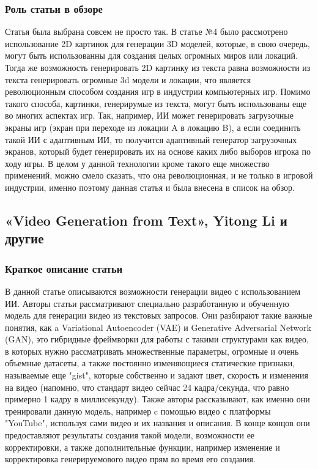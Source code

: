 \documentclass[14pt]{article}
\begin{document}
\subsubsection{Роль статьи в обзоре}
Статья была выбрана совсем не просто так. В статье №4 было рассмотрено использование 2D картинок для генерации 3D моделей, которые, в свою очередь, могут быть использованны для создания целых огромных миров или локаций. Тогда же возможность генерировать 2D картинку из текста равна возможности из текста генерировать огромные 3d модели и локации, что является революционным способом создания игр в индустрии компьютерных игр. Помимо такого способа, картинки, генерирумые из текста, могут быть использованы еще во многих аспектах игр. Так, например, ИИ может генерировать загрузочные экраны игр (экран при переходе из локации A в локацию B), а если соединить такой ИИ с адаптивным ИИ, то получится адаптивный генератор загрузочных экранов, который будет генерировать их на основе каких либо выборов игрока по ходу игры. В целом у данной технологии кроме такого еще множество применений, можно смело сказать, что она революционная, и не только в игровой индустрии, именно поэтому данная статья и была внесена в список на обзор.

\subsection{«Video Generation from Text», Yitong Li и другие}
\subsubsection{Краткое описание статьи}
В данной статье описываются возможности генерации видео с использованием ИИ. Авторы статьи рассматривают специально разработанную и обученную модель для генерации видео из текстовых запросов. Они разбирают такие важные понятия, как a Variational Autoencoder (VAE) и Generative Adversarial Network (GAN), это гибридные фреймворки для работы с такими структурами как видео, в которых нужно рассматривать множественные параметры, огромные и очень объемные датасеты, а также постоянно изменяющиеся статические признаки, называемые еще "gist", которые собственно и задают цвет, скорость и изменения на видео (напомню, что стандарт видео сейчас 24 кадра/секунда, что равно примерно 1 кадру в миллисекунду). Также авторы рассказывают, как именно они тренировали данную модель, например c помощью видео с платформы "YouTube", используя сами видео и их названия и описания. В конце концов они предоставляют результаты создания такой модели, возможности ее корректировки, а также дополнительные функции, например изменение и корректировка генерируемового видео прям во время его создания.
\end{document}
